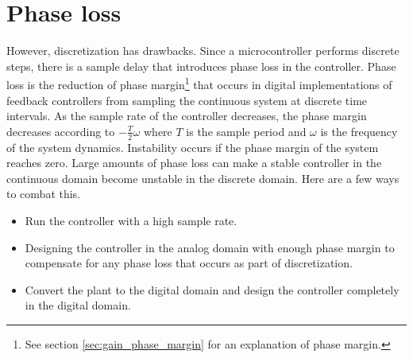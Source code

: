 \section{Phase loss}

However, \gls{discretization} has drawbacks. Since a microcontroller performs
discrete steps, there is a sample delay that introduces phase loss in the
controller. Phase loss is the reduction of \gls{phase margin}\footnote{See
section \ref{sec:gain_phase_margin} for an explanation of phase margin.} that
occurs in digital implementations of feedback controllers from sampling the
continuous \gls{system} at discrete time intervals. As the sample rate of the
controller decreases, the \gls{phase margin} decreases according to
$-\frac{T}{2}\omega$ where $T$ is the sample period and $\omega$ is the
frequency of the \gls{system} dynamics. Instability occurs if the
\gls{phase margin} of the \gls{system} reaches zero. Large amounts of phase loss
can make a stable controller in the continuous domain become unstable in the
discrete domain. Here are a few ways to combat this.
\begin{itemize}
  \item Run the controller with a high sample rate.
  \item Designing the controller in the analog domain with enough
    \gls{phase margin} to compensate for any phase loss that occurs as part of
    \gls{discretization}.
  \item Convert the \gls{plant} to the digital domain and design the controller
    completely in the digital domain.
\end{itemize}
